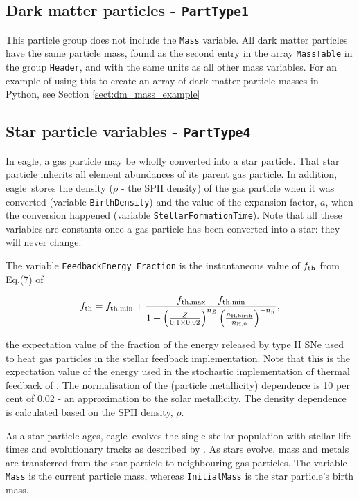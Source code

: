 \documentclass[10pt, a4paper]{article}
\newcommand{\eagle}{{\sc eagle}}
\begin{document}
\subsection{Dark matter particles - \texttt{PartType1}}
This particle group does not include the \texttt{Mass} variable. All dark
matter particles have the same particle mass, found as the second entry in the
array \texttt{MassTable} in the group \texttt{Header}, and with the same units
as all other mass variables. For an example of using this to create an array of
dark matter particle masses in {\sc Python}, see Section
\ref{sect:dm_mass_example}

\subsection{Star particle variables - \texttt{PartType4}}
\label{sect:feedback}
In \eagle, a gas particle may be wholly converted into a star particle. That
star particle inherits all element abundances of its parent gas particle. In
addition, \eagle\ stores the density ($\rho$ - the SPH density) of the gas
particle when it was converted (variable \texttt{BirthDensity}) and the value
of the expansion factor, $a$, when the conversion happened (variable
\texttt{StellarFormationTime}). Note that all these variables are constants
once a gas particle has been converted into a star: they will never change.

The variable \texttt{FeedbackEnergy\_Fraction} is the instantaneous value of
$f_{\rm th}$ from Eq.(7) of \cite{schaye2015}

\begin{equation}
f_{\rm th} = f_{\rm th,min} + \frac{f_{\rm th,max} - f_{\rm th,min}}
{1 + \left (\frac{Z}{0.1\times 0.02}\right )^{n_Z} \left (\frac{n_{\rm H,birth}}{n_{{\rm H},0}}\right )^{-n_n}},
\label{eq:f(Z,n)}
\end{equation} 

\noindent the expectation value of the fraction of the energy released by
type II SNe used to heat gas particles in the stellar feedback implementation.
Note that this is the expectation value of the energy used in the stochastic
implementation of thermal feedback of \cite{DallaVecchia_Schaye2012}. The
normalisation of the (particle metallicity) dependence is 10 per cent of 0.02 -
an approximation to the solar metallicity. The density dependence is calculated
based on the SPH density, $\rho$.

As a star particle ages, \eagle\ evolves the single stellar population with
stellar life-times and evolutionary tracks as described by \cite{wiersma09b}.
As stars evolve, mass and metals are transferred from the star particle to
neighbouring gas particles. The variable \texttt{Mass} is the current particle
mass, whereas \texttt{InitialMass} is the star particle's birth mass.
\end{document}
